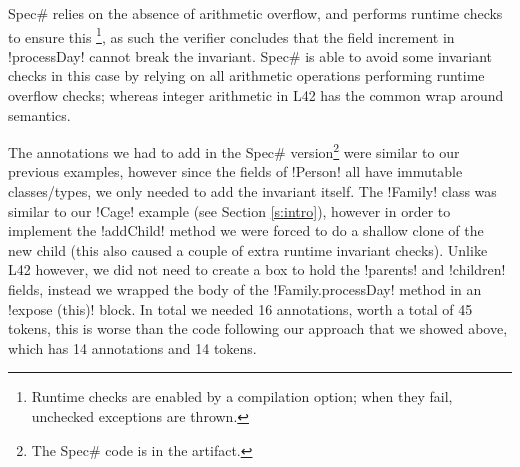 Spec\# relies on the absence of arithmetic overflow, and performs runtime checks to ensure this%
\footnote{%
Runtime checks are enabled by a compilation option; when they fail, unchecked exceptions are thrown.%
}, as such the verifier concludes that the field increment in \Q!processDay! cannot break the invariant.
Spec\# is able to avoid some invariant checks in this case 
by relying on all arithmetic operations performing runtime overflow checks;
whereas integer arithmetic in L42 has the common wrap around semantics.









The annotations we had to add in the Spec\# version\footnote{The Spec\# code is in the artifact.} were similar to our previous examples, however since the fields of \Q!Person! all have immutable classes/types, we only needed to add the invariant itself. The \Q!Family! class was similar to our \Q!Cage! example (see Section \ref{s:intro}), however in order to implement the \Q!addChild! method we were forced to do a shallow clone of the new child (this also caused a couple of extra runtime invariant checks). Unlike L42 however, we did not need to create a box to hold the \Q!parents! and \Q!children! fields, instead we wrapped the body of the \Q!Family.processDay! method in an \Q!expose (this)! block. In total we needed 16 annotations, worth a total of 45 tokens, this is worse than the code following our approach that we showed above, which has 14 annotations and 14 tokens.


